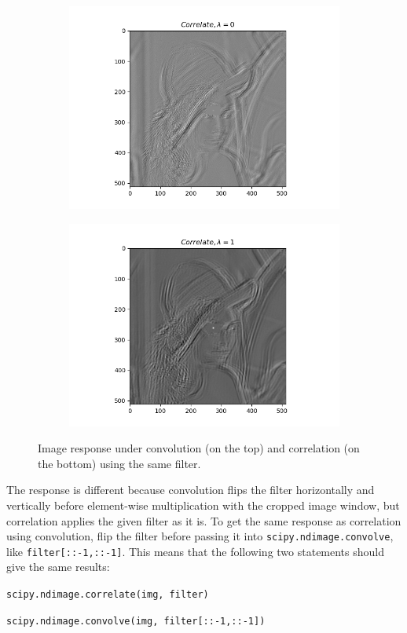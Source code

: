 \documentclass{article} %
\begin{document}
\begin{figure}[H]
\begin{subfigure}[b]{0.49\textwidth}
            \includegraphics[width=\textwidth]{q43_img0.png}
        \end{subfigure}
        \begin{subfigure}[b]{0.49\textwidth}
            \centering
            \includegraphics[width=\textwidth]{q43_img1.png}
        \end{subfigure}
        \caption{Image response under convolution (on the top) and correlation (on the bottom) using the same filter.}
    \end{figure}



    The response is different because convolution flips the filter horizontally and vertically before element-wise multiplication with the cropped image window, but correlation applies the given filter as it is. To get the same response as correlation using convolution, flip the filter before passing it into \verb|scipy.ndimage.convolve|, like \verb|filter[::-1,::-1]|. This means that the following two statements should give the same results:
    \medskip

    \centering
    \texttt{scipy.ndimage.correlate(img, filter)}
    \smallskip

    \centering
    \texttt{scipy.ndimage.convolve(img, filter{[}::-1,::-1{]})}
    
\end{document}

